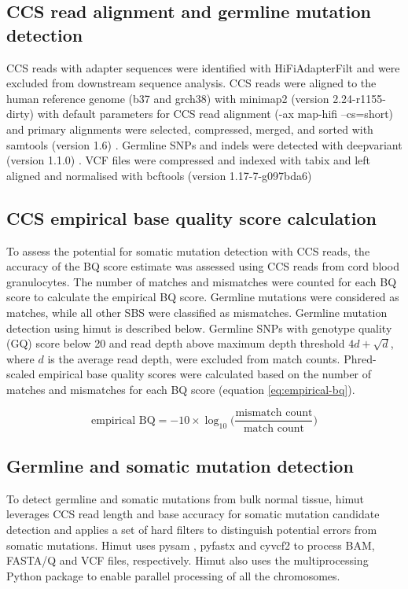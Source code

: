 \subsection{CCS read alignment and germline mutation detection}
CCS reads with adapter sequences were identified with HiFiAdapterFilt \cite{Sim2022-pi} and were excluded from downstream sequence analysis. CCS reads were aligned to the human reference genome (b37 and grch38) with minimap2 (version 2.24-r1155-dirty) with default parameters for CCS read alignment (-ax map-hifi --cs=short) \cite{Li2018-am} and primary alignments were selected, compressed, merged, and sorted with samtools (version 1.6) \cite{Li2009-qp}. Germline SNPs and indels were detected with deepvariant (version 1.1.0) \cite{Poplin2018-ub}. VCF files were compressed and indexed with tabix \cite{Li2011-zj} and left aligned and normalised with bcftools (version 1.17-7-g097bda6) \cite{Li2011-ag}


\subsection{CCS empirical base quality score calculation}

To assess the potential for somatic mutation detection with CCS reads, the accuracy of the BQ score estimate was assessed using CCS reads from cord blood granulocytes. The number of matches and mismatches were counted for each BQ score to calculate the empirical BQ score. Germline mutations were considered as matches, while all other SBS were classified as mismatches. Germline mutation detection using himut is described below. Germline SNPs with genotype quality (GQ) score below 20 and read depth above maximum depth threshold $4d + \sqrt{d}$, where $d$ is the average read depth, were excluded from match counts. Phred-scaled empirical base quality scores were calculated based on the number of matches and mismatches for each BQ score (equation \ref{eq:empirical-bq}).

\begin{equation} \label{eq:empirical-bq}
\text{empirical BQ} = -10 \times \log_{10} \Big( \frac{\text{mismatch count}}{\text{match count}} \Big)
\end{equation}

\subsection{Germline and somatic mutation detection}

To detect germline and somatic mutations from bulk normal tissue, himut leverages CCS read length and base accuracy for somatic mutation candidate detection and applies a set of hard filters to distinguish potential errors from somatic mutations. Himut uses pysam \cite{pysam}, pyfastx \cite{Du2021-ya} and cyvcf2 \cite{Pedersen2017-ld} to process BAM, FASTA/Q and VCF files, respectively. Himut also uses the multiprocessing Python package \cite{multiprocessing} to enable parallel processing of all the chromosomes. 


